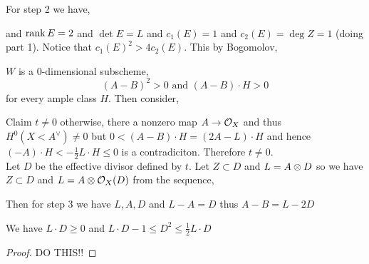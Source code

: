 \documentclass[12pt]{article}
\begin{document}
For step 2 we have,
\begin{center}
\end{center}
and $\operatorname{\mathrm{rank}}{E} = 2$ and $\det{E} = L$ and $c_1(E) = 1$ and $c_2(E) = \deg{Z} = 1$ (doing part 1). Notice that $c_1(E)^2 > 4 c_2(E)$. This by Bogomolov,
\begin{center}
\end{center}
$W$ is a $0$-dimensional subscheme,
\[ (A - B)^2 > 0 \text{ and } (A - B) \cdot H > 0 \]
for every ample class $H$. Then consider,
\begin{center}
\end{center}
Claim $t \neq 0$ otherwise, there a nonzero map $A \to \mathcal{O}_{X}$ and thus $H^0(X< A^\vee) \neq 0$ but $0 < (A-B) \cdot H = (2 A - L) \cdot H$ and hence $(-A) \cdot H < - \frac{1}{2} L \cdot H \le 0$ is a contradiciton. Therefore $t \neq 0$. 
\bigskip\\
Let $D$ be the effective divisor defined by $t$. Let $Z \subset D$ and $L = A \otimes D$ so we have $Z \subset D$ and $L = A \otimes \mathcal{O}_{X}(D)$ from the sequence,
\begin{center}
\end{center}

Then for step 3 we have $L, A, D$ and $L - A = D$ thus $A - B = L - 2 D$

\begin{lemma}
We have $L \cdot D \ge 0$ and $L \cdot D - 1 \le D^2 \le \frac{1}{2} L \cdot D$ 
\end{lemma}

\begin{proof}
DO THIS!!
\end{proof}
\end{document}
